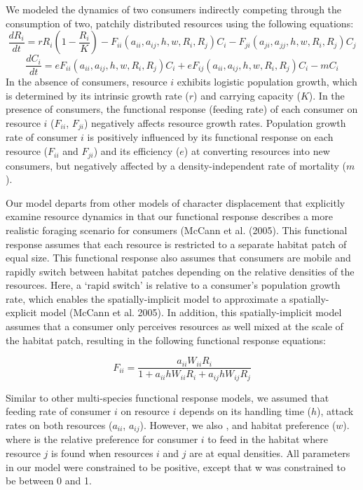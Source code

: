 \documentclass[11pt]{article}
\begin{document}
We modeled the dynamics of two consumers indirectly competing through the consumption of two, patchily distributed resources using the following equations:
\[\frac{dR_i}{dt}=rR_i\left ( 1-\frac{R_i}{K} \right )-F_{ii}\left ( a_{ii},a_{ij},h,w,R_i,R_j \right )C_i-F_{ji}\left ( a_{ji},a_{jj},h,w,R_i,R_j \right )C_j\]\[\frac{dC_i}{dt}=eF_{ii}\left ( a_{ii},a_{ij},h,w,R_i,R_j \right )C_i+eF_{ij}\left ( a_{ii},a_{ij},h,w,R_i,R_j \right )C_i-mC_i\]
In the absence of consumers, resource $i$ exhibits logistic population growth, which is determined by its intrinsic growth rate ($r$) and carrying capacity ($K$). In the presence of consumers, the functional response (feeding rate) of each consumer on resource $i$ ($F_{ii}$, $F_{ji}$) negatively affects resource growth rates. Population growth rate of consumer $i$ is positively influenced by its functional response on each resource ($F_{ii}$ and $F_{ji}$) and its efficiency ($e$) at converting resources into new consumers, but negatively affected by a density-independent rate of mortality ($m$).

Our model departs from other models of character displacement that explicitly examine resource dynamics in that our functional response describes a more realistic foraging scenario for consumers (McCann et al. (2005). This functional response assumes that each resource is restricted to a separate habitat patch of equal size. This functional response also assumes that consumers are mobile and rapidly switch between habitat patches depending on the relative densities of the resources. Here, a ‘rapid switch’ is relative to a consumer’s population growth rate, which enables the spatially-implicit model to approximate a spatially-explicit model (McCann et al. 2005). In addition, this spatially-implicit model assumes that a consumer only perceives resources as well mixed at the scale of the habitat patch, resulting in the following functional response equations:

\[F_{ii}=\frac{a_{ii}W_{ii}R_i}{1+a_{ii}hW_{ii}R_i+a_{ij}hW_{ij}R_j}\]

Similar to other multi-species functional response models, we assumed that feeding rate of consumer $i$ on resource $i$ depends on its handling time ($h$), attack rates on both resources ($a_{ii}$, $a_{ij}$). However, we also , and habitat preference ($w$). where is the relative preference for consumer $i$ to feed in the habitat where resource $j$ is found when resources $i$ and $j$ are at equal densities. All parameters in our model were constrained to be positive, except that w was constrained to be between 0 and 1.
\end{document}

